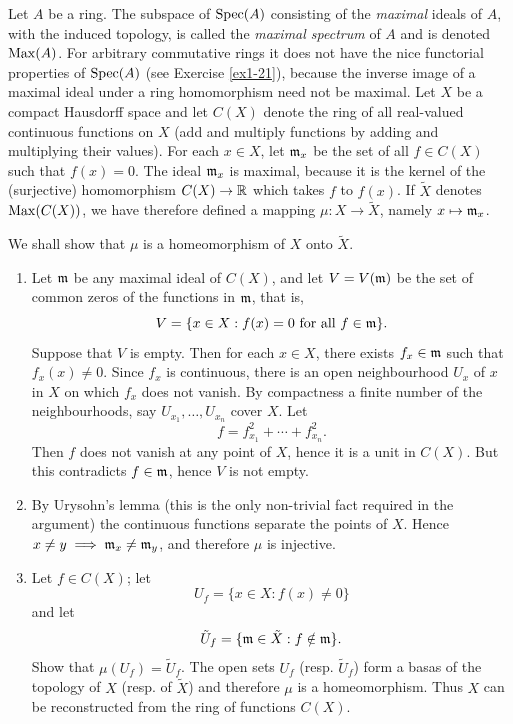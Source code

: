 \documentclass{article}
\begin{document}
\begin{exercise}
    Let \(A\) be a ring.
    The subspace of \(\operatorname{Spec}(A)\) consisting of the \textit{maximal} ideals of \(A\), with the induced topology, is called the \textit{maximal spectrum} of \(A\) and is denoted \(\operatorname{Max}(A)\).
    For arbitrary commutative rings it does not have the nice functorial properties of \(\operatorname{Spec}(A)\) (see Exercise \ref{ex1-21}), because the inverse image of a maximal ideal under a ring homomorphism need not be maximal.
    Let \(X\) be a compact Hausdorff space and let \(C(X)\) denote the ring of all real-valued continuous functions on \(X\) (add and multiply functions by adding and multiplying their values).
    For each \(x \in X\), let \(\mathfrak{m}_x\) be the set of all \(f \in C(X)\) such that \(f(x) = 0\).
    The ideal \(\mathfrak{m}_x\) is maximal, because it is the kernel of the (surjective) homomorphism \(C(X) \to \mathbb{R}\) which takes \(f\) to \(f(x)\).
    If \(\tilde{X}\) denotes \(\operatorname{Max}(C(X))\), we have therefore defined a mapping \(\mu : X \to \tilde{X}\), namely \(x \mapsto \mathfrak{m}_x\).
    
    We shall show that \(\mu\) is a homeomorphism of \(X\) onto \(\tilde{X}\).
    \begin{enumerate}
        \item
            Let \(\mathfrak{m}\) be any maximal ideal of \(C(X)\), and let \(V = V(\mathfrak{m})\) be the set of common zeros of the functions in \(\mathfrak{m}\), that is,
            \[
                V = \{x \in X : f(x) = 0 \text{ for all } f \in \mathfrak{m}\}.
            \]
            Suppose that \(V\) is empty.
            Then for each \(x \in X\), there exists \(f_x \in \mathfrak{m}\) such that \(f_x(x) \neq 0\).
            Since \(f_x\) is continuous, there is an open neighbourhood \(U_x\) of \(x\) in \(X\) on which \(f_x\) does not vanish.
            By compactness a finite number of the neighbourhoods, say \(U_{x_1}, \dots, U_{x_n}\) cover \(X\).
            Let
            \[
                f = f_{x_1}^2 + \cdots + f_{x_n}^2.
            \]
            Then \(f\) does not vanish at any point of \(X\), hence it is a unit in \(C(X)\).
            But this contradicts \(f \in \mathfrak{m}\), hence \(V\) is not empty.
        \item
            By Urysohn's lemma (this is the only non-trivial fact required in the argument) the continuous functions separate the points of \(X\).
            Hence \(x \neq y \implies \mathfrak{m}_x \neq \mathfrak{m}_y\), and therefore \(\mu\) is injective.
        \item
            Let \(f \in C(X)\); let
            \[
                U_f = \{x \in X : f(x) \neq 0\}
            \]
            and let
            \[
                \tilde{U}_f = \{\mathfrak{m} \in \tilde{X} : f \notin \mathfrak{m}\}.
            \]
            Show that \(\mu(U_f) = \tilde{U}_f\).
            The open sets \(U_f\) (resp. \(\tilde{U}_f\)) form a basas of the topology of \(X\) (resp. of \(\tilde{X}\)) and therefore \(\mu\) is a homeomorphism.
            Thus \(X\) can be reconstructed from the ring of functions \(C(X)\).
    \end{enumerate}
\end{exercise}
\end{document}
